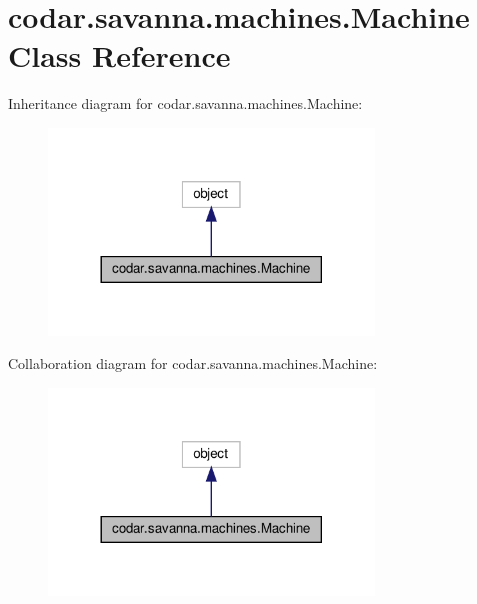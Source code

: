 \hypertarget{classcodar_1_1savanna_1_1machines_1_1_machine}{}\section{codar.\+savanna.\+machines.\+Machine Class Reference}
\label{classcodar_1_1savanna_1_1machines_1_1_machine}


Inheritance diagram for codar.\+savanna.\+machines.\+Machine\+:
\nopagebreak
\begin{figure}[H]
\begin{center}
\leavevmode
\includegraphics[width=245pt]{classcodar_1_1savanna_1_1machines_1_1_machine__inherit__graph}
\end{center}
\end{figure}


Collaboration diagram for codar.\+savanna.\+machines.\+Machine\+:
\nopagebreak
\begin{figure}[H]
\begin{center}
\leavevmode
\includegraphics[width=245pt]{classcodar_1_1savanna_1_1machines_1_1_machine__coll__graph}
\end{center}
\end{figure}
